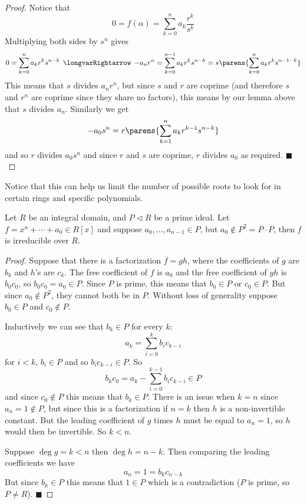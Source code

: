 \documentclass[10pt]{article}
\def\implies{\,\mathrel{\longvarRightarrow}\,}
\let\pideal=\triangleleft
\def\qed{\hskip1cm\hbox{}\hfill$\blacksquare$}
\begin{document}
\begin{proof}

    Notice that
    \[ 0 = f(\alpha) = \sum_{k=0}^n a_k\frac{r^k}{s^k} \]
    Multiplying both sides by $s^n$ gives
    \[ 0 = \sum_{k=0}^n a_kr^ks^{n-k} \implies -a_nr^n = \sum_{k=0}^{n-1} a_kr^ks^{n-k} = s\parens{\sum_{k=0}^n a_kr^ks^{n-1-k}} \]
    This means that $s$ divides $a_nr^n$, but since $s$ and $r$ are coprime (and therefore $s$ and $r^n$ are coprime since they share no factors), this means by our lemma above that $s$ divides $a_n$.
    Similarly we get
    \[ -a_0s^n = r\parens{\sum_{k=1}^n a_kr^{k-1}s^{n-k}} \]
    and so $r$ divides $a_0s^n$ and since $r$ and $s$ are coprime, $r$ divides $a_0$ as required.
    \qed

\end{proof}

Notice that this can help us limit the number of possible roots to look for in certain rings and specific polynomials.

\begin{prop*}

    Let $R$ be an integral domain, and $P\pideal R$ be a prime ideal.
    Let $f=x^n+\cdots+a_0\in R[x]$ and suppose $a_0,\dots,a_{n-1}\in P$, but $a_0\notin P^2=P\cdot P$, then $f$ is irreducible over $R$.

\end{prop*}

\begin{proof}

    Suppose that there is a factorization $f=gh$, where the coefficients of $g$ are $b_k$ and $h$'s are $c_k$.
    The free coefficient of $f$ is $a_0$ and the free coefficient of $gh$ is $b_0c_0$, so $b_0c_0=a_0\in P$.
    Since $P$ is prime, this means that $b_0\in P$ or $c_0\in P$.
    But since $a_0\notin P^2$, they cannot both be in $P$.
    Without loss of generality suppose $b_0\in P$ and $c_0\notin P$.

    Inductively we can see that $b_k\in P$ for every $k$:
    \[ a_k = \sum_{i=0}^k b_ic_{k-i} \]
    for $i<k$, $b_i\in P$ and so $b_ic_{k-i}\in P$.
    So
    \[ b_kc_0 = a_k - \sum_{i=0}^{k-1} b_ic_{k-i} \in P \]
    and since $c_0\notin P$ this means that $b_k\in P$.
    There is an issue when $k=n$ since $a_n=1\notin P$, but since this is a factorization if $n=k$ then $h$ is a non-invertible constant.
    But the leading coefficient of $g$ times $h$ must be equal to $a_n=1$, so $h$ would then be invertible.
    So $k<n$.

    Suppose $\deg g=k<n$ then $\deg h=n-k$.
    Then comparing the leading coefficients we have
    \[ a_n = 1 = b_kc_{n-k} \]
    But since $b_k\in P$ this means that $1\in P$ which is a contradiction ($P$ is prime, so $P\neq R$).
    \qed

\end{proof}
\end{document}
